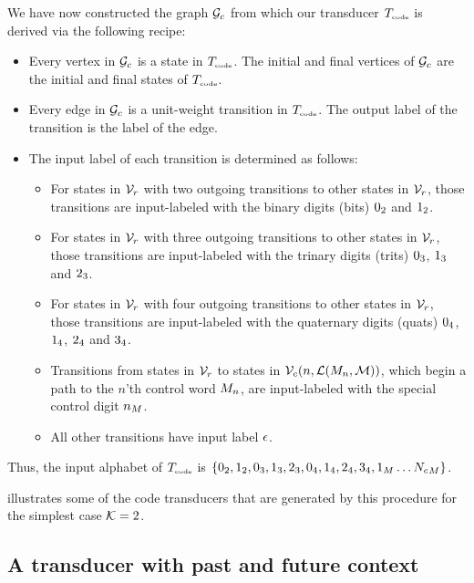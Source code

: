 \documentclass[english]{article}
\begin{document}
We have now constructed the graph ${\cal G}_c$ from which our transducer $T_{\mbox{\tiny code}}$
is derived via the following recipe:
\begin{itemize}
\item Every vertex in ${\cal G}_c$ is a state in $T_{\mbox{\tiny code}}$.
The initial and final vertices of ${\cal G}_c$ are the initial and final states of $T_{\mbox{\tiny code}}$.
\item Every edge in ${\cal G}_c$ is a unit-weight transition in $T_{\mbox{\tiny code}}$.
The output label of the transition is the label of the edge.
\item The input label of each transition is determined as follows:
\begin{itemize}
\item For states in ${\cal V}_r$ with two outgoing transitions to other states in ${\cal V}_r$, those transitions are input-labeled with the binary digits (bits) $0_2$ and $1_2$.
\item For states in ${\cal V}_r$ with three outgoing transitions to other states in ${\cal V}_r$, those transitions are input-labeled with the trinary digits (trits) $0_3$, $1_3$ and $2_3$.
\item For states in ${\cal V}_r$ with four outgoing transitions to other states in ${\cal V}_r$, those transitions are input-labeled with the quaternary digits (quats) $0_4$, $1_4$, $2_4$ and $3_4$.
\item Transitions from states in ${\cal V}_r$ to states in ${\cal V}_c(n,{\cal L}(M_n,{\cal M}))$,
which begin a path to the $n$'th control word $M_n$,
are input-labeled with the special control digit ${n}_M$.
\item All other transitions have input label $\epsilon$.
\end{itemize}
\end{itemize}

Thus, the input alphabet of $T_{\mbox{\tiny code}}$
is $\{ 0_2, 1_2,
       0_3, 1_3, 2_3,
       0_4, 1_4, 2_4, 3_4,
       {1}_M \ldots {N_c}_M \}$.

 illustrates some of the code transducers that are generated by this procedure for the simplest case ${\cal K}=2$.
       
\subsection{A transducer with past and future context}
\end{document}
